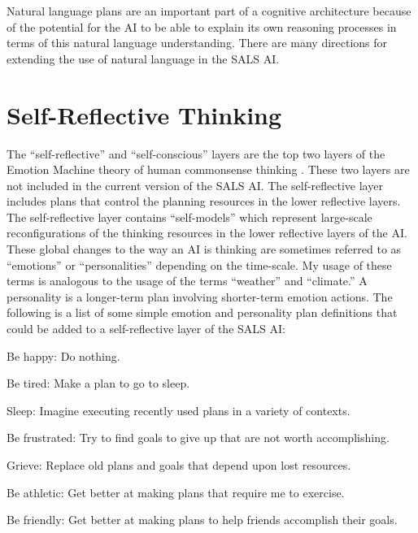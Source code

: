 Natural language plans are an important part of a cognitive
architecture because of the potential for the AI to be able to explain
its own reasoning processes in terms of this natural language
understanding.  There are many directions for extending the use of
natural language in the SALS AI.


\section{Self-Reflective Thinking}

The ``self-reflective'' and ``self-conscious'' layers are the top two
layers of the Emotion Machine theory of human commonsense thinking
\cite[]{minsky:2006}.  These two layers are not included in the
current version of the SALS AI.  The self-reflective layer includes
plans that control the planning resources in the lower reflective
layers.  The self-reflective layer contains ``self-models'' which
represent large-scale reconfigurations of the thinking resources in
the lower reflective layers of the AI.  These global changes to the
way an AI is thinking are sometimes referred to as ``emotions'' or
``personalities'' depending on the time-scale.  My usage of these
terms is analogous to the usage of the terms ``weather'' and
``climate.''  A personality is a longer-term plan involving
shorter-term emotion actions.  The following is a list of some simple
emotion and personality plan definitions that could be added to a
self-reflective layer of the SALS AI:

\begin{packed_itemize}
\item{Be happy: Do nothing.}
\item{Be tired: Make a plan to go to sleep.}
\item{Sleep: Imagine executing recently used plans in a variety of
  contexts.}
\item{Be frustrated: Try to find goals to give up that are not worth
  accomplishing.}
\item{Grieve: Replace old plans and goals that depend upon lost
  resources.}
\item{Be athletic: Get better at making plans that require me to exercise.}
\item{Be friendly: Get better at making plans to help friends accomplish their goals.}
\end{packed_itemize}

